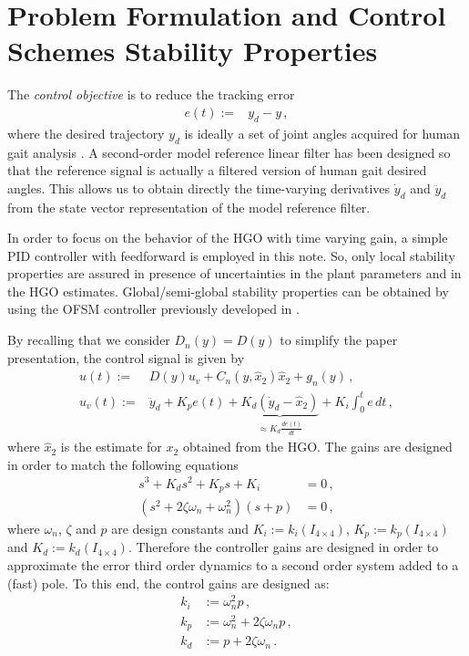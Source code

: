 \documentclass[letterpaper, 10 pt, conference]{ieeeconf}  %
\theoremstyle{plain}
\theoremstyle{definition}
\theoremstyle{remark}
\begin{document}
\section{Problem Formulation and Control Schemes Stability Properties}

The {\em control objective} is to reduce the tracking error 
%
\begin{align}
e(t) := & y_{d} - y\,,
\end{align}
%
where the desired trajectory $y_d$ is ideally a set of joint angles acquired for human gait analysis \cite{Schwartz2008}.  A second-order model reference linear filter %
%
%
has been designed so that the reference signal is actually a filtered version of human gait desired angles. This allows us to obtain directly the  time-varying derivatives $\dot{y}_d$ and $\ddot{y}_d$ from the state vector representation of the model reference filter.

In order to focus on the behavior of the HGO with time varying gain, a simple  PID controller with feedforward is employed  in this note. So, only local stability properties are assured in presence of uncertainties in the plant parameters and in the HGO estimates. Global/semi-global stability properties can be obtained by using the  OFSM controller previously developed in \cite{POH:2011}.

By recalling that we  consider $D_n(y)=D(y)$ to simplify the paper presentation, the control  signal is given by
%
\begin{align}
u(t) := & D(y) u_v + C_{n}(y,\hat{x}_2) \hat{x}_2+g_{n}(y)\,, \\
u_v(t):= &\ddot{y}_d + K_p e(t) + \underbrace{K_d (\dot{y}_d - \hat{x}_2)}_{\approx K_d \frac{de(t)}{dt}} + K_i\int_{0}^{t}e \, dt\,,
\label{eq:defu}
\end{align}
%
where $\hat{x}_2$ is the estimate for $x_2$ obtained from the HGO. The gains are designed in order to match the following equations
%
\begin{align}
	s^3 + K_ds^2 + K_ps + K_i &= 0\,, \\
	(s^2 + 2\zeta \omega_n + \omega_n^2)(s + p) &= 0\,,
\end{align}
%
where $\omega_n$, $\zeta$ and $p$ are design constants and $K_i := k_i(I_{4 \times 4})$, $K_p := k_p(I_{4 \times 4})$ and $K_d := k_d(I_{4 \times 4})$. Therefore the controller gains are designed in order to approximate the error third order dynamics to a second order system added to a (fast) pole. To this end, the control gains are designed as:
%
\begin{align}
	k_i &:= \omega_n^2p\,, \\
	k_p &:= \omega_n^2 + 2\zeta \omega_n p\,, \\
	k_d &:= p + 2\zeta \omega_n\,. 
\end{align}
%
\end{document}
